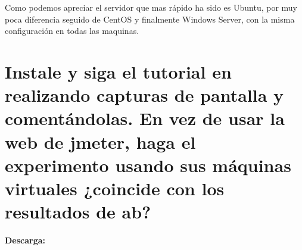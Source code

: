 Como podemos apreciar el servidor que mas rápido ha sido es Ubuntu, por muy poca diferencia seguido de CentOS y finalmente Windows Server, con la misma configuración en todas las maquinas.

\section[Cuestión 4]{Instale y siga el tutorial en	 realizando capturas de pantalla y comentándolas. En vez de usar la web de jmeter, haga el experimento usando sus máquinas virtuales ¿coincide con los resultados de ab?}

\textbf{Descarga: }

